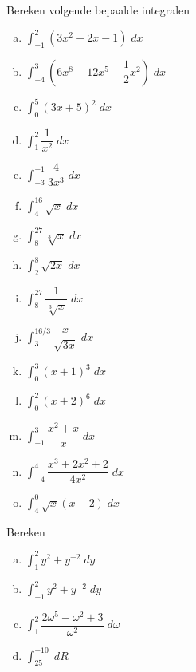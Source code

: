 \documentclass[a4paper,12pt, twoside]{article}
\begin{document}
\begin{oefening}
Bereken volgende bepaalde integralen
\begin{multicols}{2}
\begin{enumerate}[(a)]
\itemsep1em
  \item $\displaystyle \int_{-1}^2 (3x^2+2x-1)\;dx$
  \item $\displaystyle \int_{-4}^3 (6x^8+12x^5-\dfrac{1}{2}x^2)\;dx$
  \item $\displaystyle \int_{0}^5 (3x+5)^2\;dx$
  \item $\displaystyle \int_1^2 \dfrac{1}{x^2}\;dx$
  \item $\displaystyle \int_{-3}^{-1} \dfrac{4}{3x^3} \;dx$
  \item $\displaystyle \int_4^{16} \sqrt{x} \;dx$
  \item $\displaystyle \int_8^{27} \sqrt[3]{x} \;dx$
  \item $\displaystyle \int_2^8 \sqrt{2x} \;dx$
  \item $\displaystyle \int_8^{27} \dfrac{1}{\sqrt[3]{x}} \;dx$
  \item $\displaystyle \int_3^{16/3} \dfrac{x}{\sqrt{3x}} \;dx$
  \item $\displaystyle \int_{0}^3 (x+1)^3\;dx$
  \item $\displaystyle \int_{0}^2 (x+2)^6\;dx$
  \item $\displaystyle \int_{-1}^3 \dfrac{x^2+x}{x}\;dx$
  \item $\displaystyle \int_{-4}^4 \dfrac{x^3+2x^2+2}{4x^2}\;dx$
  \item $\displaystyle \int_{4}^0 \sqrt{x}(x-2)\;dx$
\end{enumerate}
\end{multicols}
\end{oefening}

\begin{oefening}
Bereken
\begin{multicols}{2}
\begin{enumerate}[(a)]
\itemsep1em
  \item $\displaystyle \int_1^2 y^2+y^{-2} \;dy$
  \item $\displaystyle \int_{-1}^2 y^2+y^{-2} \;dy$
  \item $\displaystyle \int_1^2 \dfrac{2\omega^5-\omega^2+3}{\omega^2} \;d\omega$
  \item $\displaystyle \int_{25}^{-10} \;dR$
\end{enumerate}
\end{multicols}
\end{oefening}
\end{document}
